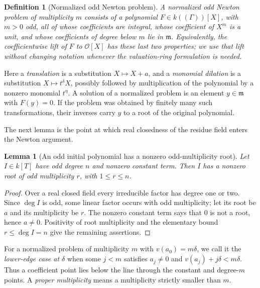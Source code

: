 \documentclass[11pt]{article}
\newcommand{\Val}{v}
\newcommand{\Ocal}{\mathcal O}
\theoremstyle{proofnote}
\newtheorem{lemma}[theorem]{Lemma}
\newtheorem{definition}[theorem]{Definition}
\begin{document}
\begin{definition}[Normalized odd Newton problem]
\label{def:odd-newton-problem}
  A normalized odd Newton problem of multiplicity \(m\) consists of a
  polynomial \(F\in k((\Gamma))[X]\), with \(m>0\) odd, all of whose
  coefficients are integral, whose coefficient of \(X^m\) is a unit, and
  whose coefficients of degree below \(m\) lie in \(\mathfrak m\).
  Equivalently, the coefficientwise lift of \(F\) to \(\Ocal[X]\) has these
  last two properties; we use that lift without changing notation whenever
  the valuation-ring formulation is needed.
\end{definition}

Here a \emph{translation} is a substitution \(X\mapsto X+a\), and a
\emph{monomial dilation} is a substitution \(X\mapsto t^\delta X\), possibly
followed by multiplication of the polynomial by a nonzero monomial
\(t^\eta\).  A solution of a normalized problem is an element
\(y\in\mathfrak m\) with \(F(y)=0\).  If the problem was obtained by finitely
many such transformations, their inverses carry \(y\) to a root of the
original polynomial.

The next lemma is the point at which real closedness of the residue field
enters the Newton argument.

\begin{lemma}[An odd initial polynomial has a nonzero odd-multiplicity root]
\label{lem:proper-odd-root}
  Let \(I\in k[T]\) have odd degree \(n\) and nonzero constant term.
  Then \(I\) has a nonzero root of odd multiplicity \(r\), with
  \(1\le r\le n\).
\end{lemma}
\begin{proof}
  Over a real closed field every irreducible factor has degree one or two.
  Since \(\deg I\) is odd, some linear factor occurs with odd multiplicity;
  let its root be \(a\) and its multiplicity be \(r\).  The nonzero
  constant term says that \(0\) is not a root, hence \(a\ne0\).
  Positivity of root multiplicity and the elementary bound
  \(r\le\deg I=n\) give the remaining assertions.
\end{proof}

For a normalized problem of multiplicity \(m\) with
\(\Val(a_0)=m\delta\), we call it the \emph{lower-edge case at
\(\delta\)} when some \(j<m\) satisfies
\(a_j\ne0\) and \(\Val(a_j)+j\delta<m\delta\).  Thus a coefficient point
lies below the line through the constant and degree-\(m\) points.  A
\emph{proper multiplicity} means a multiplicity strictly smaller than
\(m\).
\end{document}

